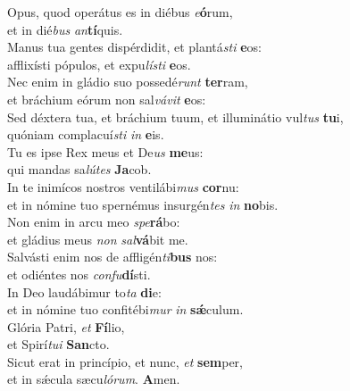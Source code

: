 \evenverse Opus, quod operátus es in diébus \textit{e}\textbf{ó}rum,~\*\\
\evenverse et in dié\textit{bus} \textit{an}\textbf{tí}quis.\\
\oddverse Manus tua gentes dispérdidit, et plantá\textit{sti} \textbf{e}os:~\*\\
\oddverse afflixísti pópulos, et expu\textit{lí}\textit{sti} \textbf{e}os.\\
\evenverse Nec enim in gládio suo possedé\textit{runt} \textbf{ter}ram,~\*\\
\evenverse et bráchium eórum non sal\textit{vá}\textit{vit} \textbf{e}os:\\
\oddverse Sed déxtera tua, et bráchium tuum, et illuminátio vul\textit{tus} \textbf{tu}i,~\*\\
\oddverse quóniam complacuí\textit{sti} \textit{in} \textbf{e}is.\\
\evenverse Tu es ipse Rex meus et De\textit{us} \textbf{me}us:~\*\\
\evenverse qui mandas sa\textit{lú}\textit{tes} \textbf{Ja}cob.\\
\oddverse In te inimícos nostros ventilábi\textit{mus} \textbf{cor}nu:~\*\\
\oddverse et in nómine tuo spernémus insurgén\textit{tes} \textit{in} \textbf{no}bis.\\
\evenverse Non enim in arcu meo \textit{spe}\textbf{rá}bo:~\*\\
\evenverse et gládius meus \textit{non} \textit{sal}\textbf{vá}bit me.\\
\oddverse Salvásti enim nos de affligén\textit{ti}\textbf{bus} nos:~\*\\
\oddverse et odiéntes nos \textit{con}\textit{fu}\textbf{dí}sti.\\
\evenverse In Deo laudábimur to\textit{ta} \textbf{di}e:~\*\\
\evenverse et in nómine tuo confitébi\textit{mur} \textit{in} \textbf{sǽ}culum.\\
\oddverse Glória Patri, \textit{et} \textbf{Fí}lio,~\*\\
\oddverse et Spirí\textit{tu}\textit{i} \textbf{San}cto.\\
\evenverse Sicut erat in princípio, et nunc, \textit{et} \textbf{sem}per,~\*\\
\evenverse et in sǽcula sæcu\textit{ló}\textit{rum}. \textbf{A}men.\\
